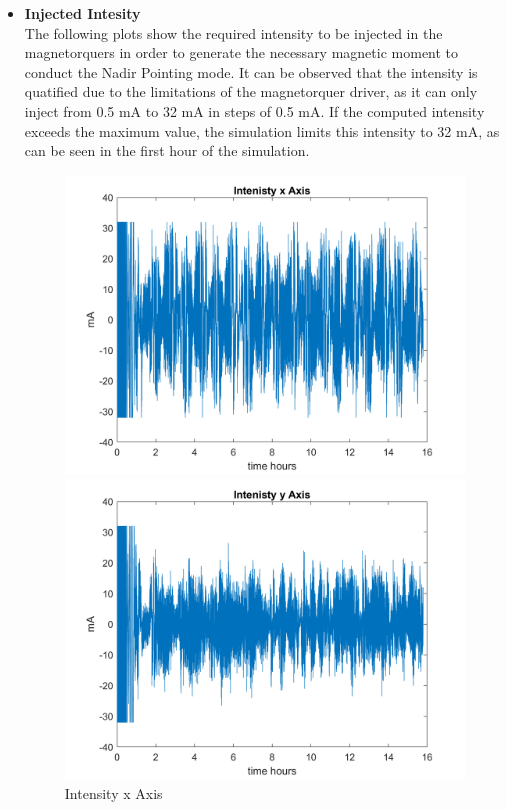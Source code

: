 \begin{itemize}
    \item \textbf{Injected Intesity}\\
    The following plots show the required intensity to be injected in the magnetorquers in order to generate the
    necessary magnetic moment to conduct the Nadir Pointing mode. It can be observed that the intensity is quatified due 
    to the limitations of the magnetorquer driver, as it can only inject from 0.5 mA to 32 mA in steps of 0.5 mA. If the
    computed intensity exceeds the maximum value, the simulation limits this intensity to 32 mA, as can be seen in the first
    hour of the simulation. 
    \begin{figure}[H]
        \centering
        \begin{minipage}{0.32\linewidth}
            \centering
            \includegraphics[width=0.95\linewidth]{res/img/Nadir_no_EKF/Intenisty x Axis.png}
            \caption{Intensity x Axis}
            \label{fig:IntensityX}
        \end{minipage}\hfill
        \begin{minipage}{0.32\linewidth}
            \centering
            \includegraphics[width=0.95\linewidth]{res/img/Nadir_no_EKF/Intenisty y Axis.png}

\end{minipage}
\end{figure}
\end{itemize}
